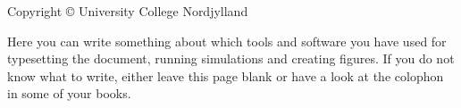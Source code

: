 \thispagestyle{empty}
{\small
\strut\vfill %
\noindent Copyright \copyright{} University College Nordjylland \the\year\par
\vspace{0.2cm}
\noindent Here you can write something about which tools and software you have used for typesetting the document, running simulations and creating figures. If you do not know what to write, either leave this page blank or have a look at the colophon in some of your books.
}
\clearpage

